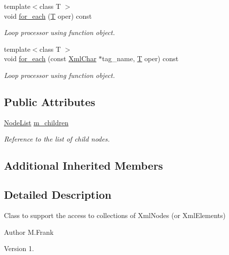 \begin{DoxyCompactItemize}
{\footnotesize template$<$class T $>$ }\\void \hyperlink{class_d_d4hep_1_1_x_m_l_1_1_collection__t_a89d9136a6e08193870c708564a1aecb7}{for\+\_\+each} (\hyperlink{class_t}{T} oper) const
\begin{DoxyCompactList}\small\item\em Loop processor using function object. \end{DoxyCompactList}\item 
{\footnotesize template$<$class T $>$ }\\void \hyperlink{class_d_d4hep_1_1_x_m_l_1_1_collection__t_a6b4e31f738c848ce7b277f1a9fa5a637}{for\+\_\+each} (const \hyperlink{namespace_d_d4hep_1_1_x_m_l_a09e5d9cc86ed782f6826dfe0778c1815}{Xml\+Char} $\ast$tag\+\_\+name, \hyperlink{class_t}{T} oper) const
\begin{DoxyCompactList}\small\item\em Loop processor using function object. \end{DoxyCompactList}\end{DoxyCompactItemize}
\subsection*{Public Attributes}
\begin{DoxyCompactItemize}
\item 
\hyperlink{class_d_d4hep_1_1_x_m_l_1_1_node_list}{Node\+List} \hyperlink{class_d_d4hep_1_1_x_m_l_1_1_collection__t_a258610612b270dbcadb7ddec5206387d}{m\+\_\+children}
\begin{DoxyCompactList}\small\item\em Reference to the list of child nodes. \end{DoxyCompactList}\end{DoxyCompactItemize}
\subsection*{Additional Inherited Members}


\subsection{Detailed Description}
Class to support the access to collections of Xml\+Nodes (or Xml\+Elements) 

\begin{DoxyAuthor}{Author}
M.\+Frank 
\end{DoxyAuthor}
\begin{DoxyVersion}{Version}
1. 
\end{DoxyVersion}


